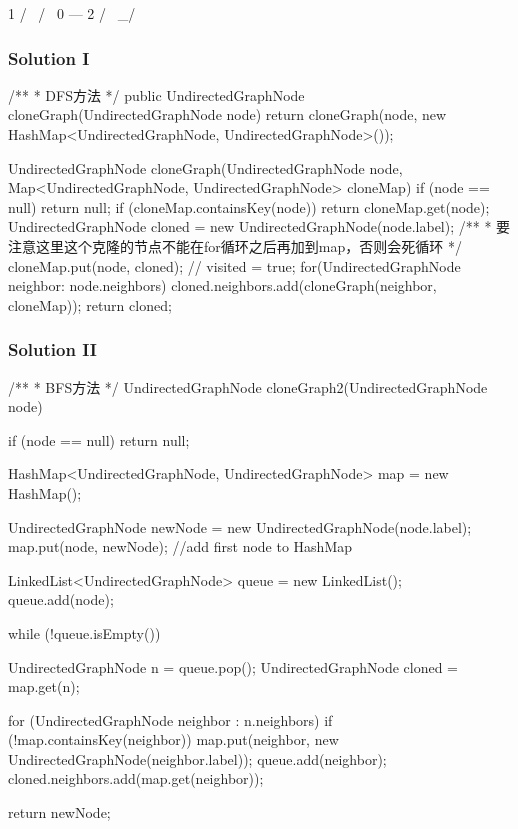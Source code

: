\begin{Code}
       1
      / \
     /   \
    0 --- 2
         / \
         \_/
\end{Code}

\subsubsection{Solution I}

\begin{Code}
/**
 * DFS方法
 */
public UndirectedGraphNode cloneGraph(UndirectedGraphNode node) {
    return cloneGraph(node, new HashMap<UndirectedGraphNode, UndirectedGraphNode>());
}

UndirectedGraphNode cloneGraph(UndirectedGraphNode node, Map<UndirectedGraphNode, UndirectedGraphNode> cloneMap) {
    if (node == null) {
        return null;
    }
    if (cloneMap.containsKey(node)) {
        return cloneMap.get(node);
    }
    UndirectedGraphNode cloned = new UndirectedGraphNode(node.label);
    /**
     * 要注意这里这个克隆的节点不能在for循环之后再加到map，否则会死循环
     */
    cloneMap.put(node, cloned); // visited = true;
    for(UndirectedGraphNode neighbor: node.neighbors){
        cloned.neighbors.add(cloneGraph(neighbor, cloneMap));
    }
    return cloned;
}
\end{Code}

\newpage

\subsubsection{Solution II}

\begin{Code}
/**
 * BFS方法
 */
UndirectedGraphNode cloneGraph2(UndirectedGraphNode node) {
    if (node == null) return null;

    HashMap<UndirectedGraphNode, UndirectedGraphNode> map = new HashMap();

    UndirectedGraphNode newNode = new UndirectedGraphNode(node.label);
    map.put(node, newNode); //add first node to HashMap

    LinkedList<UndirectedGraphNode> queue = new LinkedList();
    queue.add(node);

    while (!queue.isEmpty()) {
        UndirectedGraphNode n = queue.pop();
        UndirectedGraphNode cloned = map.get(n);

        for (UndirectedGraphNode neighbor : n.neighbors) {
            if (!map.containsKey(neighbor)) {
                map.put(neighbor, new UndirectedGraphNode(neighbor.label));
                queue.add(neighbor);
            }
            cloned.neighbors.add(map.get(neighbor));
        }
    }

    return newNode;
}
\end{Code}

